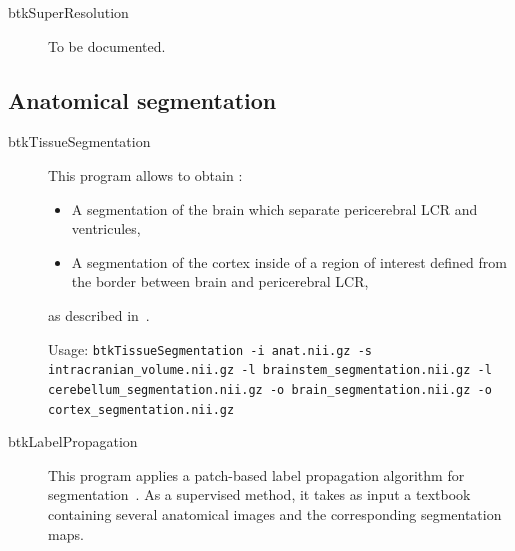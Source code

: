 \begin{description}
 \item[btkSuperResolution] To be documented. 

\end{description}

\subsection{Anatomical segmentation}
\label{subsec:ana_seg}

\begin{description}
 \item[btkTissueSegmentation] This program allows to obtain :
        \begin{itemize}
         \item A segmentation of the brain which separate pericerebral LCR and ventricules,
         \item A segmentation of the cortex inside of a region of interest defined from the border between brain and pericerebral LCR,
        \end{itemize}
        as described in~\cite{caldairou_segmentation_2011}.
        
        Usage: \texttt{btkTissueSegmentation -i anat.nii.gz -s intracranian\_volume.nii.gz -l brainstem\_segmentation.nii.gz -l cerebellum\_segmentation.nii.gz -o brain\_segmentation.nii.gz -o cortex\_segmentation.nii.gz}
\end{description}

\begin{description}
 \item[btkLabelPropagation] This program applies a patch-based label propagation algorithm for segmentation~\cite{rousseau_supervised_2011}. As a supervised method, it takes as input a textbook containing several anatomical images and the corresponding segmentation maps.
\end{description}


